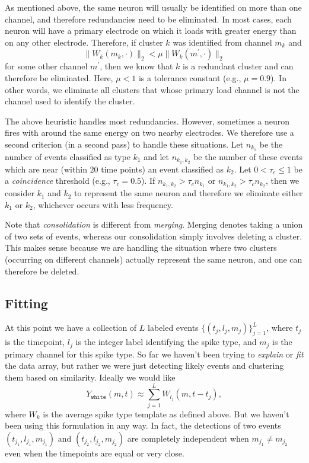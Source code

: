 \documentclass[hidelinks,10pt]{article}
\begin{document}
As mentioned above, the same neuron will usually be identified on more than one channel, and therefore redundancies need to be eliminated. In most cases, each neuron will have a primary electrode on which it loads with greater energy than on any other electrode. Therefore, if cluster $k$ was identified from channel $m_k$ and 
$$\|W_k(m_k,\cdot)\|_2<\mu \|W_k(m^\prime,\cdot)\|_2$$
for some other channel $m^\prime$, then we know that $k$ is a redundant cluster and can therefore be eliminated. Here, $\mu<1$ is a tolerance constant (e.g., $\mu=0.9$). In other words, we eliminate all clusters that whose primary load channel is not the channel used to identify the cluster.

The above heuristic handles most redundancies. However, sometimes a neuron fires with around the same energy on two nearby electrodes. We therefore use a second criterion (in a second pass) to handle these situations. Let $n_{k_1}$ be the number of events classified as type $k_1$ and let $n_{k_1,k_2}$ be the number of these events which are near (within $20$ time points) an event classified as $k_2$. Let $0<\tau_c\leq 1$ be a \emph{coincidence} threshold (e.g., $\tau_c=0.5$). If $n_{k_1,k_2}>\tau_c n_{k_1}$ or $n_{k_1,k_2}>\tau_c n_{k_2}$, then we consider $k_1$ and $k_2$ to represent the same neuron and therefore we eliminate either $k_1$ or $k_2$, whichever occurs with less frequency.

Note that \emph{consolidation} is different from \emph{merging}. Merging denotes taking a union of two sets of events, whereas our consolidation simply involves deleting a cluster. This makes sense because we are handling the situation where two clusters (occurring on different channels) actually represent the same neuron, and one can therefore be deleted.

\subsection {Fitting}

At this point we have a collection of $L$ labeled events $\{(t_j,l_j,m_j)\}_{j=1}^L$, where $t_j$ is the timepoint, $l_j$ is the integer label identifying the spike type, and $m_j$ is the primary channel for this spike type. So far we haven't been trying to \emph{explain} or \emph{fit} the data array, but rather we were just detecting likely events and clustering them based on similarity. Ideally we would like
$$Y_\texttt{white}(m,t)\approx\sum_{j=1}^L W_{l_j}(m,t-t_j),$$
where $W_k$ is the average spike type template as defined above.
But we haven't been using this formulation in any way. In fact, the detections of two events $(t_{j_1},l_{j_1},m_{j_1})$ and $(t_{j_2},l_{j_2},m_{j_2})$ are completely independent when $m_{j_1}\neq m_{j_2}$ even when the timepoints are equal or very close.
\end{document}
